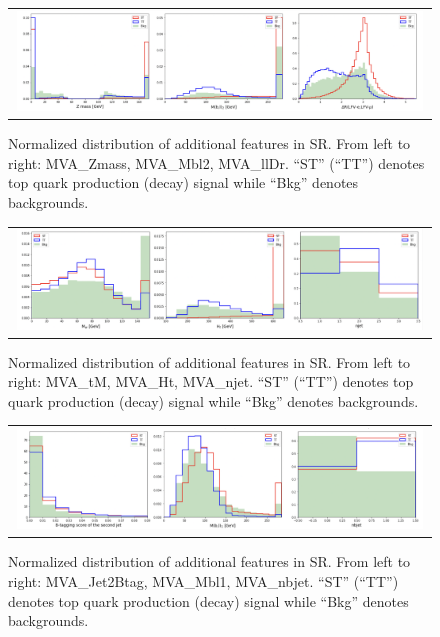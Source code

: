\begin{figure}[tbh!]
 \begin{center}
 \begin{tabular}{c}
 \includegraphics[width=0.99\textwidth]{figures/Part3/BDT/Features3}\\
 \end{tabular}
 \caption{Normalized distribution of additional features in SR. From left to right: MVA\_Zmass, MVA\_Mbl2, MVA\_llDr. ``ST'' (``TT'') denotes top quark production (decay) signal while ``Bkg'' denotes backgrounds.}
 \label{fig:Features3}
 \end{center}
\end{figure}

\begin{figure}[tbh!]
 \begin{center}
 \begin{tabular}{c}
 \includegraphics[width=0.99\textwidth]{figures/Part3/BDT/Features4}\\
 \end{tabular}
 \caption{Normalized distribution of additional features in SR. From left to right: MVA\_tM, MVA\_Ht, MVA\_njet. ``ST'' (``TT'') denotes top quark production (decay) signal while ``Bkg'' denotes backgrounds.}
 \label{fig:Features4}
 \end{center}
\end{figure}

\begin{figure}[tbh!]
 \begin{center}
 \begin{tabular}{c}
 \includegraphics[width=0.99\textwidth]{figures/Part3/BDT/Features5}\\
 \end{tabular}
 \caption{Normalized distribution of additional features in SR. From left to right: MVA\_Jet2Btag, MVA\_Mbl1, MVA\_nbjet. ``ST'' (``TT'') denotes top quark production (decay) signal while ``Bkg'' denotes backgrounds.}
 \label{fig:Features5}
 \end{center}
\end{figure}

